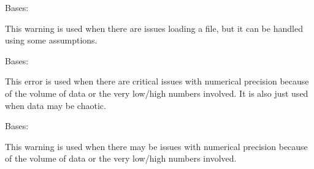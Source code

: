 \documentclass[letterpaper,10pt,english]{sphinxmanual}
\begin{document}

\begin{fulllineitems}
\label{\detokenize{python_docstrings/IfA_Smeargle.meta.errors:IfA_Smeargle.meta.errors.ImportingWarning}}
Bases: {\hyperref[\detokenize{python_docstrings/IfA_Smeargle.meta.errors:IfA_Smeargle.meta.errors.Smeargle_Warning}]{}}

This warning is used when there are issues loading a file, but it can
be handled using some assumptions.

\end{fulllineitems}


\begin{fulllineitems}
\label{\detokenize{python_docstrings/IfA_Smeargle.meta.errors:IfA_Smeargle.meta.errors.ImprecisionError}}
Bases: {\hyperref[\detokenize{python_docstrings/IfA_Smeargle.meta.errors:IfA_Smeargle.meta.errors.Smeargle_Exception}]{}}

This error is used when there are critical issues with numerical
precision because of the volume of data or the very low/high numbers
involved. It is also just used when data may be chaotic.

\end{fulllineitems}


\begin{fulllineitems}
\label{\detokenize{python_docstrings/IfA_Smeargle.meta.errors:IfA_Smeargle.meta.errors.ImprecisionWarning}}
Bases: {\hyperref[\detokenize{python_docstrings/IfA_Smeargle.meta.errors:IfA_Smeargle.meta.errors.Smeargle_Warning}]{}}

This warning is used when there may be issues with numerical precision
because of the volume of data or the very low/high numbers involved.

\end{fulllineitems}
\end{document}
